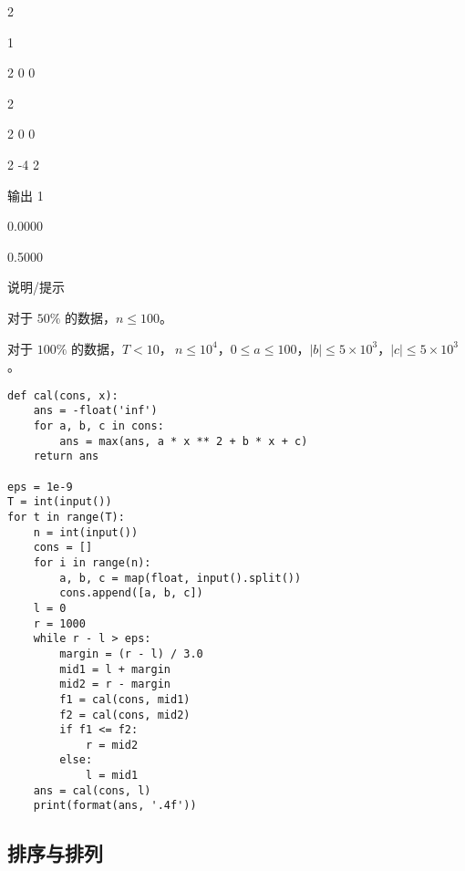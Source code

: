\documentclass[../main]{subfiles}
\begin{document}
\begin{sloppy}
2

1

2 0 0

2

2 0 0

2 -4 2

输出 1


0.0000

0.5000


说明/提示

对于 $50\%$ 的数据，$n\le 100$。

对于 $100\%$ 的数据，$T<10$，$\ n\le 10^4$，$0\le a\le 100$，$|b| \le 5\times 10^3$，$|c| \le 5\times 10^3$。

\begin{lstlisting}[style = Python]
def cal(cons, x):
    ans = -float('inf')
    for a, b, c in cons:
        ans = max(ans, a * x ** 2 + b * x + c)
    return ans

eps = 1e-9
T = int(input())
for t in range(T):
    n = int(input())
    cons = []
    for i in range(n):
        a, b, c = map(float, input().split())
        cons.append([a, b, c])
    l = 0
    r = 1000
    while r - l > eps:
        margin = (r - l) / 3.0
        mid1 = l + margin
        mid2 = r - margin
        f1 = cal(cons, mid1)
        f2 = cal(cons, mid2)
        if f1 <= f2:
            r = mid2
        else:
            l = mid1
    ans = cal(cons, l)
    print(format(ans, '.4f'))
\end{lstlisting}

\newpage

\subsection{排序与排列}



\end{sloppy}
\end{document}
